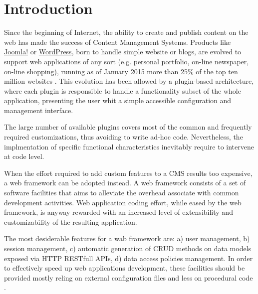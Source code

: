 \section{Introduction}\label{sec:introduction}

Since the beginning of Internet, the ability to create and publish content on the web has made the success of Content Management Systems. Products like \href{http://www.joomla.org/}{Joomla!} or \href{https://wordpress.org/}{WordPress}, born to handle simple website or blogs, are evolved to support web applications of any sort (e.g.  personal portfolio, on-line newspaper, on-line shopping), running as of January 2015 more than 25\% of the top ten million websites \cite{usage-cms}. This evolution has been allowed by a plugin-based architecture, where each plugin is responsible to handle a functionality subset of the whole application, presenting the user whit a simple accessible configuration and management interface.

The large number of available plugins covers most of the common and frequently required customizations, thus avoiding to write ad-hoc code. Nevertheless, the implmentation of specific functional characteristics inevitably require to intervene at code level.

When the effort required to add custom features to a CMS results too expensive, a web framework can be adopted instead. A web framework consists of a set of software facilities that aims to alleviate the overhead associate with common development activities. Web application coding effort, while eased by the web framework, is anyway rewarded with an increased level of extensibility and customizability of the resulting application.

The most desiderable features for a wab framework are: a) user management, b) session management, c) automatic generation of CRUD methods on data models exposed via HTTP RESTfull APIs, d) data access policies management. In order to effectively speed up web applications development, these facilities should be provided mostly reling on external configuration files and less on procedural code \cite{6859693}.


